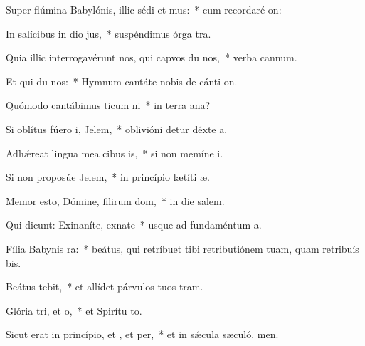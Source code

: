 \item Super flúmina Babylónis, illic sédi et mus:~* cum recordaré on:
\item In salícibus in dio jus,~* suspéndimus órga tra.
\item Quia illic interrogavérunt nos, qui capvos du nos,~* verba cannum.
\item Et qui du nos:~* Hymnum cantáte nobis de cánti on.
\item Quómodo cantábimus ticum ni~* in terra ana?
\item Si oblítus fúero i, Jelem,~* oblivióni detur déxte a.
\item Adhǽreat lingua mea cibus is,~* si non memíne i.
\item Si non proposúe Jelem,~* in princípio lætíti æ.
\item Memor esto, Dómine, filirum dom,~* in die salem.
\item Qui dicunt: Exinaníte, exnate~* usque ad fundaméntum  a.
\item Fília Babynis ra:~* beátus, qui retríbuet tibi retributiónem tuam, quam retribuís bis.
\item Beátus  tebit,~* et allídet párvulos tuos  tram.
\item Glória tri, et o,~* et Spirítu to.
\item Sicut erat in princípio, et , et per,~* et in sǽcula sæculó. men.
